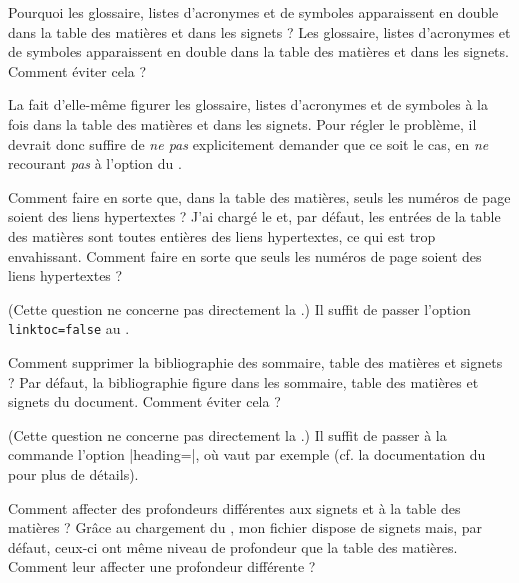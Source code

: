 \begin{dbfaq}{Pourquoi les glossaire, listes d'acronymes et de symboles
    apparaissent en double dans la table des matières et dans les signets ?}{}
  Les glossaire, listes d'acronymes et de symboles apparaissent en double dans
  la table des matières et dans les signets. Comment éviter cela ?%
\end{dbfaq}

La \yatCl{} fait d'elle-même figurer les glossaire, listes d'acronymes et de
symboles à la fois dans la table des matières et dans les signets. Pour régler
le problème, il devrait donc suffire de \emph{ne pas} explicitement demander que
ce soit le cas, en \emph{ne} recourant \emph{pas} à l'option  du
.

\begin{dbfaq}{Comment faire en sorte que, dans la table des matières, seuls
    les numéros de page soient des liens hypertextes ?}{}
  J'ai chargé le  et, par défaut, les entrées de la table des
  matières sont toutes entières des liens hypertextes, ce qui est trop
  envahissant. Comment faire en sorte que seuls les numéros de page soient des
  liens hypertextes ?
\end{dbfaq}

(Cette question ne concerne pas directement la \yatCl{}.) Il suffit de
passer l'option \lstinline|linktoc=false| au .

\begin{dbfaq}{Comment supprimer la bibliographie des sommaire, table des
    matières et signets ?}{}
  Par défaut, la bibliographie figure dans les sommaire, table des matières et
  signets du document. Comment éviter cela ?
\end{dbfaq}

(Cette question ne concerne pas directement la \yatCl{}.) Il suffit de
passer à la commande  l'option
|heading=|, où  vaut par exemple
 (cf. la documentation du  pour plus
de détails).

\begin{dbfaq}{Comment affecter des profondeurs différentes aux signets et à la
    table des matières ?}{}
  Grâce au chargement du , mon fichier 
  dispose de signets mais, par défaut, ceux-ci ont même niveau de profondeur que
  la table des matières. Comment leur affecter une profondeur différente ?
\end{dbfaq}

